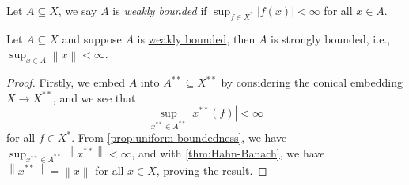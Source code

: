 \begin{definition}\label{def:weakly-bounded}
	Let \(A \subseteq X\), we say \(A\) is \emph{weakly bounded} if \(\sup _{f\in X^{\ast} }\left\vert f(x) \right\vert < \infty\) for all \(x\in A\).
\end{definition}

\begin{corollary}\label{col:weak-bd-implies-strong-bd}
	Let \(A \subseteq X\) and suppose \(A\) is \hyperref[def:weakly-bounded]{weakly bounded}, then \(A\) is strongly bounded, i.e., \(\sup _{x\in A} \left\lVert x\right\rVert < \infty \).
\end{corollary}
\begin{proof}
	Firstly, we embed \(A\) into \(A^{\ast\ast} \subseteq X^{\ast\ast} \) by considering the conical embedding \(X\to X^{\ast\ast}\), and we see that
	\[
		\sup _{x^{\ast\ast}\in A^{\ast\ast}} \left\vert x^{\ast\ast} (f) \right\vert < \infty
	\]
	for all \(f\in X^{\ast} \). From \autoref{prop:uniform-boundedness}, we have \(\sup _{x^{\ast\ast} \in A^{\ast\ast} }\left\lVert x^{\ast\ast} \right\rVert < \infty \), and with \autoref{thm:Hahn-Banach}, we have \(\left\lVert x^{\ast\ast} \right\rVert = \left\lVert x\right\rVert \) for all \(x\in X\), proving the result.
\end{proof}